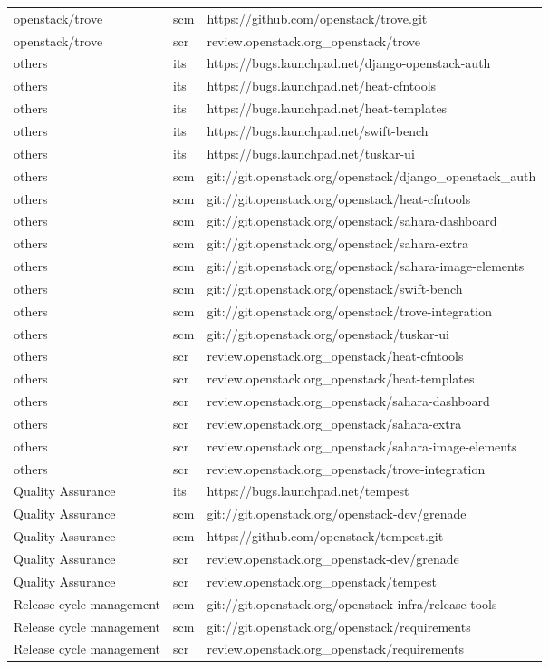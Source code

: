 \documentclass[a4wide,11pt]{report}
\begin{document}
\begin{center}
\begin{longtable}{|p{4cm}|p{1cm}|p{10cm}|}
openstack/trove&scm&https://github.com/openstack/trove.git\\ 
openstack/trove&scr&review.openstack.org\_openstack/trove\\ 
others&its&https://bugs.launchpad.net/django-openstack-auth\\ 
others&its&https://bugs.launchpad.net/heat-cfntools\\ 
others&its&https://bugs.launchpad.net/heat-templates\\ 
others&its&https://bugs.launchpad.net/swift-bench\\ 
others&its&https://bugs.launchpad.net/tuskar-ui\\ 
others&scm&git://git.openstack.org/openstack/django\_openstack\_auth\\ 
others&scm&git://git.openstack.org/openstack/heat-cfntools\\ 
others&scm&git://git.openstack.org/openstack/sahara-dashboard\\ 
others&scm&git://git.openstack.org/openstack/sahara-extra\\ 
others&scm&git://git.openstack.org/openstack/sahara-image-elements\\ 
others&scm&git://git.openstack.org/openstack/swift-bench\\ 
others&scm&git://git.openstack.org/openstack/trove-integration\\ 
others&scm&git://git.openstack.org/openstack/tuskar-ui\\ 
others&scr&review.openstack.org\_openstack/heat-cfntools\\ 
others&scr&review.openstack.org\_openstack/heat-templates\\ 
others&scr&review.openstack.org\_openstack/sahara-dashboard\\ 
others&scr&review.openstack.org\_openstack/sahara-extra\\ 
others&scr&review.openstack.org\_openstack/sahara-image-elements\\ 
others&scr&review.openstack.org\_openstack/trove-integration\\ 
Quality Assurance&its&https://bugs.launchpad.net/tempest\\ 
Quality Assurance&scm&git://git.openstack.org/openstack-dev/grenade\\ 
Quality Assurance&scm&https://github.com/openstack/tempest.git\\ 
Quality Assurance&scr&review.openstack.org\_openstack-dev/grenade\\ 
Quality Assurance&scr&review.openstack.org\_openstack/tempest\\ 
Release cycle management&scm&git://git.openstack.org/openstack-infra/release-tools\\ 
Release cycle management&scm&git://git.openstack.org/openstack/requirements\\ 
Release cycle management&scr&review.openstack.org\_openstack/requirements\\

\hline
\end{longtable}
\end{center}
\end{document}
